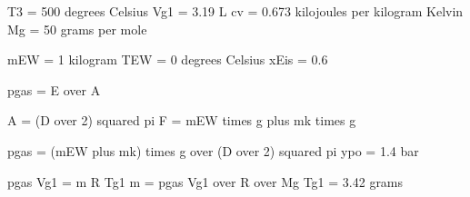 T3 = 500 degrees Celsius  
Vg1 = 3.19 L  
cv = 0.673 kilojoules per kilogram Kelvin  
Mg = 50 grams per mole  

mEW = 1 kilogram  
TEW = 0 degrees Celsius  
xEis = 0.6  

pgas = E over A  

A = (D over 2) squared pi  
F = mEW times g plus mk times g  

pgas = (mEW plus mk) times g over (D over 2) squared pi  
ypo = 1.4 bar  

pgas Vg1 = m R Tg1  
m = pgas Vg1 over R over Mg Tg1 = 3.42 grams